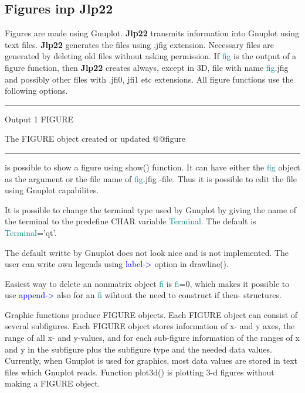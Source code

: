 \subsection{Figures inp \textbf{Jlp22}}
\label{figu}
Figures are made using Gnuplot. \textbf{Jlp22} transmits information into Gnuplot using text files.
\textbf{Jlp22} generates the files using .jfig extension. Necessary files are generated  by deleting old
files without asking permission. If \textcolor{teal}{fig} is the output of a figure function, then
\textbf{Jlp22} creates always, except in 3D, file with name \textcolor{teal}{fig}.jfig and possibly other files with
.jfi0, jfi1  etc extensions.
All figure functions use the following options.
\vspace{0.3cm}
\hrule
\vspace{0.3cm}
\noindent Output  \tabto{3cm}  1 \tabto{5cm}   FIGURE  \tabto{7cm}
\begin{changemargin}{3cm}{0cm}
\noindent  The FIGURE object created or updated
@@figure
\end {changemargin}
\hrule
\vspace{0.2cm}
\begin{note}
is possible to show a figure using \textcolor{VioletRed}{show}() function. It can have either the \textcolor{teal}{fig} object as the
argument or the file name of \textcolor{teal}{fig}.jfig -file. Thus it is possible
to edit the file using Gnuplot capabilites.
\end{note}
\begin{note}
It is possible to change the terminal type used by Gnuplot by giving
the name of the terminal to the predefine CHAR variable \textcolor{teal}{Terminal}.
The default is \newline \textcolor{teal}{Terminal}='qt'.
\end{note}
\begin{note}
The default writte by Gnuplot does not look nice and is not implemented.
The user can write own legends using \textcolor{blue}{label->} option in \textcolor{VioletRed}{drawline}().
\end{note}
\begin{note}
Easiest way to delete an nonmatrix object \textcolor{teal}{fi} is \textcolor{teal}{fi}=0, which makes it possible
to use \textcolor{blue}{append->} also for an \textcolor{teal}{fi} wihtout the need to construct if then-
structures.
\end{note}
\begin{note}
Graphic functions produce FIGURE objects. Each FIGURE object can consist of
several subfigures. Each FIGURE object stores information of x- and y axes, the
range of all x- and y-values, and for each sub-figure information of the ranges
of x and y in the subfigure plus the subfigure type and the needed data values.
Currently, when Gnuplot is used for graphics, most data values are stored
in text files which Gnuplot reads. Function \textcolor{VioletRed}{plot3d}() is plotting 3-d figures
without making a FIGURE object.
\end{note}
